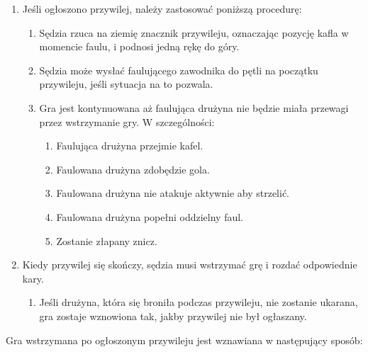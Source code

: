 \documentclass[11pt,a4paper]{article}
\renewcommand{\subsubsection}[1]{
  \oldsubsubsection{#1}%
  \label{\thesubsubsection}
}
\begin{document}
\begin{enumerate}

\item
  Jeśli ogłoszono przywilej, należy zastosować poniższą procedurę:

  \begin{enumerate}
  
  \item
    Sędzia rzuca na ziemię znacznik przywileju, oznaczając pozycję kafla
    w momencie faulu, i podnosi jedną rękę do góry.
  \item
    Sędzia może wysłać faulującego zawodnika do pętli na początku
    przywileju, jeśli sytuacja na to pozwala.
  \item
    Gra jest kontynuowana aż faulująca drużyna nie będzie miała przewagi
    przez wstrzymanie gry. W szczególności:

    \begin{enumerate}
    
    \item
      Faulująca drużyna przejmie kafel.
    \item
      Faulowana drużyna zdobędzie gola.
    \item
      Faulowana drużyna nie atakuje aktywnie aby strzelić.
    \item
      Faulowana drużyna popełni oddzielny faul.
    \item
      Zostanie złapany znicz.
    \end{enumerate}
  \end{enumerate}
\item
  Kiedy przywilej się skończy, sędzia musi wstrzymać grę i rozdać
  odpowiednie kary.

  \begin{enumerate}
  
  \item
    Jeśli drużyna, która się broniła podczas przywileju, nie zostanie
    ukarana, gra zostaje wznowiona tak, jakby przywilej nie był
    ogłaszany.
  \end{enumerate}
\end{enumerate}

\subsubsection{Restart po przywileju}

Gra wstrzymana po ogłoszonym przywileju jest wznawiana w następujący
sposób:
\end{document}
